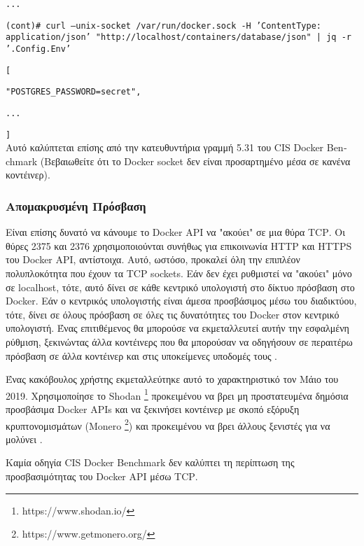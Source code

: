 \texttt{\textlatin{...}}

\texttt{\textlatin{(cont)\# curl --unix-socket /var/run/docker.sock -H 'ContentType: application/json' "http://localhost/containers/database/json" | jq -r '.Config.Env'}}

\texttt{\textlatin{[}}

\texttt{\textlatin{"POSTGRES\_PASSWORD=secret",}}

\texttt{\textlatin{...}}

\texttt{\textlatin{]}}\\

Αυτό καλύπτεται επίσης από την κατευθυντήρια γραμμή 5.31 του
\textlatin{CIS Docker Benchmark} (Βεβαιωθείτε ότι το \textlatin{Docker socket}
δεν είναι προσαρτημένο μέσα σε κανένα κοντέινερ).

\subsubsection{Απομακρυσμένη Πρόσβαση}

Είναι επίσης δυνατό να κάνουμε το \textlatin{Docker API} να "ακούει" σε μια θύρα
\textlatin{TCP}. Οι θύρες 2375 και 2376 χρησιμοποιούνται συνήθως για επικοινωνία
\textlatin{HTTP} και \textlatin{HTTPS} του \textlatin{Docker API}, αντίστοιχα.
Αυτό, ωστόσο, προκαλεί όλη την επιπλέον πολυπλοκότητα που έχουν τα
\textlatin{TCP sockets}. Εάν δεν έχει ρυθμιστεί να "ακούει" μόνο σε
\textlatin{localhost}, τότε, αυτό δίνει σε κάθε κεντρικό υπολογιστή στο δίκτυο
πρόσβαση στο \textlatin{Docker}. Εάν ο κεντρικός υπολογιστής είναι άμεσα
προσβάσιμος μέσω του διαδικτύου, τότε, δίνει σε όλους πρόσβαση σε όλες τις
δυνατότητες του \textlatin{Docker} στον κεντρικό υπολογιστή. Ένας επιτιθέμενος
θα μπορούσε να εκμεταλλευτεί αυτήν την εσφαλμένη ρύθμιση, ξεκινώντας άλλα
κοντέινερς που θα μπορούσαν να οδηγήσουν σε περαιτέρω πρόσβαση σε άλλα κοντέινερ
και στις υποκείμενες υποδομές τους \cite{Metasploit-Unprotected-TCP-Socket}.

Ένας κακόβουλος χρήστης εκμεταλλεύτηκε αυτό το χαρακτηριστικό τον Μάιο του 2019.
Χρησιμοποίησε το \textlatin{Shodan}
\footnote{\textlatin{https://www.shodan.io/}} προκειμένου να βρει μη
προστατευμένα δημόσια προσβάσιμα \textlatin{Docker APIs} και να ξεκινήσει
κοντέινερ με σκοπό εξόρυξη κρυπτονομισμάτων (\textlatin{Monero}
\footnote{\textlatin{https://www.getmonero.org/}}) και προκειμένου να βρει
άλλους ξενιστές για να μολύνει \cite{zoolu2-bot-1807} \cite{zoolu2-bot-1809}
\cite{zoolu2-bot-1853}.

Καμία οδηγία \textlatin{CIS Docker Benchmark} δεν καλύπτει τη περίπτωση της
προσβασιμότητας του \textlatin{Docker API} μέσω \textlatin{TCP}.

